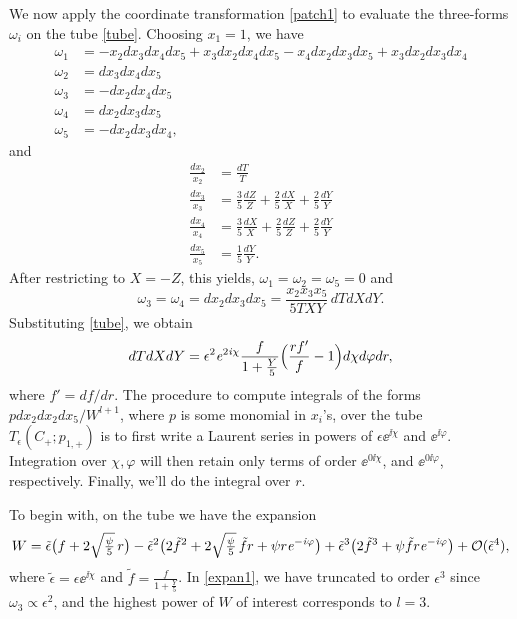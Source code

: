 We now apply the coordinate transformation \eqref{patch1} to evaluate
the three-forms $\omega_i$ on the tube \eqref{tube}. Choosing $x_1=1$,
we have
\begin{equation}
\begin{split}
\omega_1 &= -x_2dx_3dx_4dx_5+x_3dx_2dx_4dx_5-x_4dx_2dx_3dx_5+x_3dx_2dx_3dx_4 \\
\omega_2 &= dx_3dx_4dx_5\\
\omega_3 &= - dx_2dx_4dx_5\\
\omega_4 &=dx_2dx_3dx_5\\
\omega_5 &= -dx_2dx_3dx_4 ,
\end{split}
\end{equation}
and 
\begin{equation}
\begin{split}
\frac{dx_2}{x_2} & = \frac{dT}{T} \\
\frac{dx_3}{x_3} & = \frac{3}{5} \frac{dZ}{Z} + \frac{2}{5}
\frac{dX}{X} + \frac{2}{5} \frac{dY}{Y} \\
\frac{dx_4}{x_4} &= \frac{3}{5}\frac{dX}{X}+ \frac{2}{5}\frac{dZ}{Z}
+\frac{2}{5} \frac{dY}{Y} \\
\frac{dx_5}{x_5} &= \frac{1}{5}\frac{dY}{Y} .
\end{split}
\end{equation}
After restricting to $X=-Z$, this yields, $\omega_1=\omega_2=\omega_5=0$ and
\begin{equation}
\omega_3=\omega_4 = dx_2dx_3dx_5 = \frac{x_2x_3x_5}{5 TXY}\, dT dX dY .
\end{equation}
Substituting \eqref{tube}, we obtain
\begin{equation}
dTdXdY = \epsilon^2 {\it e}^{2{\it i}\chi} \frac{f}{1+\frac Y5}\Bigl(\frac{rf'}{f}-1\Bigr) 
d\chi d\varphi dr ,
\end{equation}
where $f'=df/dr$. The procedure to compute integrals of the forms
$p dx_2dx_2dx_5/W^{l+1}$, where $p$ is some monomial in $x_i$'s, over the 
tube $T_\epsilon(C_+;p_{1,+})$ is to first write a Laurent series in powers of 
$\epsilon\ee^{\ii\chi}$ and $\ee^{\ii\varphi}$. Integration over $\chi,\varphi$ 
will then retain only terms of order $\ee^{0\ii\chi}$, and $\ee^{0\ii\varphi}$, 
respectively. Finally, we'll do the integral over $r$.

To begin with, on the tube we have the expansion
\begin{equation}
\eqlabel{expan1}
W= \tilde\epsilon\bigl(f+2\sqrtpf\, r\bigr) - \tilde\epsilon^2
\bigr(2\tilde f^2+2\sqrtpf\,\tilde f r + \psi r \ee^{-\ii\varphi}\bigr)
+\tilde\epsilon^3\bigl(2\tilde f^3+\psi\tilde f r \ee^{-\ii\varphi}\bigr)
+\calo(\tilde\epsilon^4) ,
\end{equation}
where $\tilde\epsilon= \epsilon\ee^{\ii\chi}$ and $\tilde f=\frac{f}{1+\frac Y5}$.
In \eqref{expan1}, we have truncated to order $\epsilon^3$ since $\omega_3\propto 
\epsilon^2$, and the highest power of $W$ of interest corresponds to $l=3$. 

